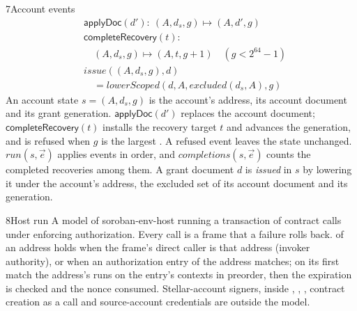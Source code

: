 \begin{perchdefinition}{7}{Account events}\label{def:account-events}
\[\begin{aligned}&\mathsf{applyDoc}(d'):\ (A, d_s, g) \mapsto (A, d', g)\\
&\mathsf{completeRecovery}(t):\\
&\quad (A, d_s, g) \mapsto (A, t, g + 1) \quad (g < 2^{64} - 1)\\
&\mathit{issue}((A, d_s, g), d)\\
&\quad = \mathit{lowerScoped}(d, A, \mathit{excluded}(d_s, A), g)\end{aligned}\]
An account state \(s = (A, d_s, g)\) is the account's address, its account document and its grant generation. \(\mathsf{applyDoc}(d')\) replaces the account document; \(\mathsf{completeRecovery}(t)\) installs the recovery target \(t\) and advances the generation, and is refused when \(g\) is the largest . A refused event leaves the state unchanged. \(\mathit{run}(s, \vec e)\) applies events in order, and \(\mathit{completions}(s, \vec e)\) counts the completed recoveries among them. A grant document \(d\) is \emph{issued} in \(s\) by lowering it under the account's address, the excluded set of its account document and its generation.
\end{perchdefinition}
\begin{perchdefinition}{8}{Host run}\label{def:host-run}
A model of soroban-env-host running a transaction of contract calls under enforcing authorization. Every call is a frame that a failure rolls back.  of an address holds when the frame's direct caller is that address (invoker authority), or when an authorization entry of the address matches; on its first match the address's  runs on the entry's contexts in preorder, then the expiration is checked and the nonce consumed. Stellar-account signers,  inside , , , contract creation as a call and source-account credentials are outside the model.
\end{perchdefinition}
